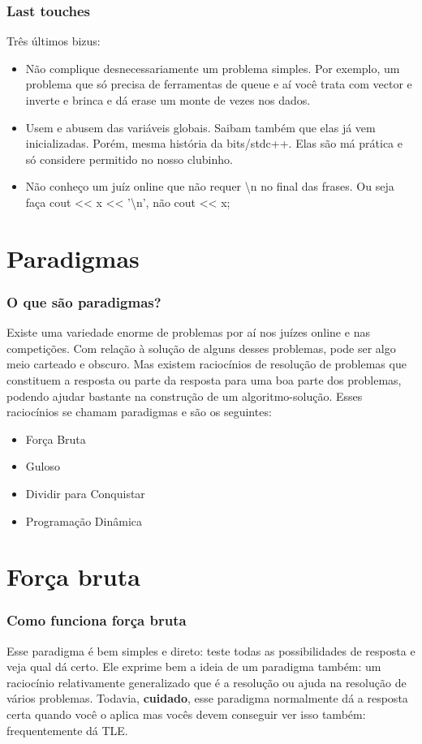 \documentclass{beamer}
\begin{document}
	\begin{frame}
	\frametitle{Last touches}
		Três últimos bizus:
		\begin{itemize}
			\item Não complique desnecessariamente um problema simples. Por exemplo,
			um problema que só precisa de ferramentas de queue e aí você trata com
			vector e inverte e brinca e dá erase um monte de vezes nos dados.
			\item Usem e abusem das variáveis globais. Saibam também que elas já vem
			inicializadas. Porém, mesma história da bits/stdc++. Elas são má prática
			e só considere permitido no nosso clubinho.
			\item Não conheço um juíz online que não requer \textbackslash n no final das frases.
			Ou seja
			faça cout << x << '\textbackslash n', não cout << x;
		\end{itemize}
	\end{frame}

\section{Paradigmas}

	\begin{frame}
	\frametitle{O que são paradigmas?}
	Existe uma variedade enorme de problemas por aí nos juízes online e nas competições.
	Com relação à solução de alguns desses problemas, pode ser algo meio carteado e
	obscuro. Mas existem raciocínios de resolução de problemas que constituem a resposta
	ou parte da resposta para uma boa parte dos problemas, podendo ajudar bastante
	na construção de um algoritmo-solução. Esses raciocínios se chamam paradigmas e são
	os seguintes:
	\begin{itemize}
		\item Força Bruta
		\item Guloso
		\item Dividir para Conquistar
		\item Programação Dinâmica
	\end{itemize}
	\end{frame}
	
\section{Força bruta}

	\begin{frame}
	\frametitle{Como funciona força bruta}
		Esse paradigma é bem simples e direto: teste todas as possibilidades de resposta
		e veja qual dá certo. Ele exprime bem a ideia de um paradigma também: um
		raciocínio relativamente generalizado que é a resolução ou ajuda na resolução
		de vários problemas. Todavia, \textbf{cuidado}, esse paradigma normalmente
		dá a resposta certa quando você o aplica mas vocês devem conseguir ver isso
		também: frequentemente dá TLE.
	\end{frame}
\end{document}
